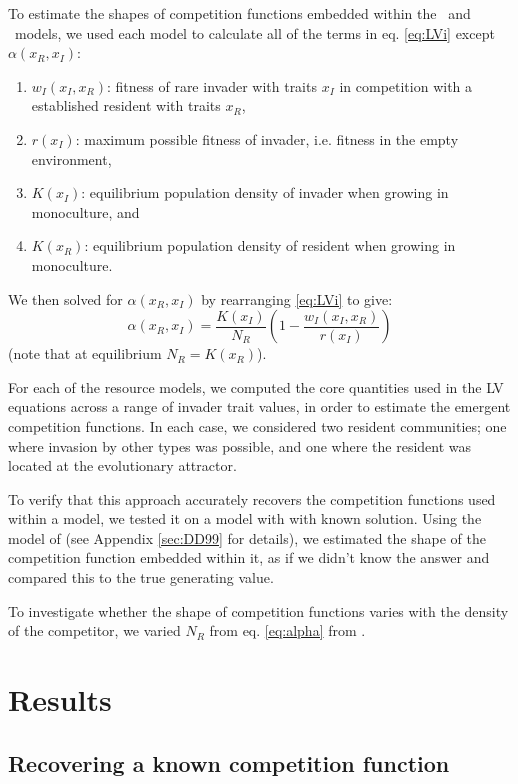 \documentclass[a4paper,11pt]{article}
\newcommand{\verify}[1]{{\color{navy}{(verify: #1)}}}
\begin{document}
To estimate the shapes of competition functions embedded within the \Rstar\ and \plant\ models, we used each model to calculate all of the terms in eq. \ref{eq:LVi} except $\alpha(x_R, x_I)$:
\begin{enumerate}
\item $w_I(x_I, x_R)$: fitness of rare invader with traits $x_I$ in competition with a established resident with traits $x_R$,
\item $r(x_I)$: maximum possible fitness of invader, i.e. fitness in the empty environment,
\item $K(x_I)$: equilibrium population density of invader when growing in monoculture, and
\item $K(x_R)$: equilibrium population density of resident when growing in monoculture.
\end{enumerate}
We then solved for $\alpha(x_R, x_I)$ by rearranging  \ref{eq:LVi} to give:
\begin{equation} \label{eq:alpha}
  \alpha(x_R, x_I) = \frac{K(x_I)}{N_R} \left(1 - \frac{w_I(x_I, x_R)}{r(x_I)}\right)
\end{equation}
(note that at equilibrium $N_R = K(x_R)$).

For each of the resource models, we computed the core quantities used in the LV equations across a range of invader trait values, in order to estimate the emergent competition functions. In each case, we considered two resident communities; one where invasion by other types was possible, and one where the resident was located at the evolutionary attractor. 

To verify that this approach accurately recovers the competition functions used within a model, we tested it on a model with with known solution. Using the model of \citet{Dieckmann-1999} (see Appendix \ref{sec:DD99} for details), we estimated the shape of the competition function embedded within it, as if we didn't know the answer and compared this to the true generating value.

To investigate whether the shape of competition functions varies with the density of the competitor, we varied $N_R$ from eq. \ref{eq:alpha} from \verify{ its equilibrium value of $N_R=K(x_R)$}.

\section{Results}

\subsection{Recovering a known competition function}
\end{document}
